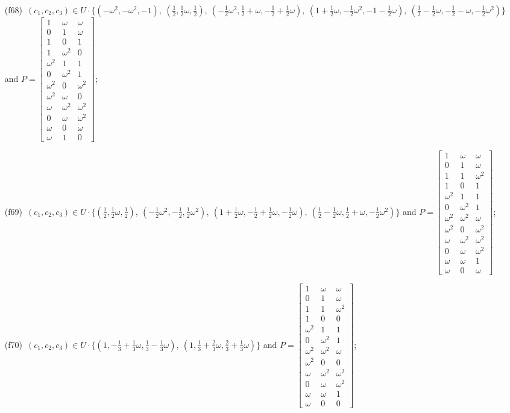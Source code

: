 \begin{enumerate}
\item[(f68)\,\newitem] $(c_1,c_2,c_3)\in U\cdot\{(-\omega^2,-\omega^2,-1),\allowbreak\ (\tfrac{1}{2},\tfrac{1}{2}\omega,\tfrac{1}{2}),\allowbreak\ (-\tfrac{1}{2}\omega^2,\tfrac{1}{2}+\omega,-\tfrac{1}{2}+\tfrac{1}{2}\omega),\allowbreak\ (1+\tfrac{1}{2}\omega,-\tfrac{1}{2}\omega^2,-1-\tfrac{1}{2}\omega),\allowbreak\ (\tfrac{1}{2}-\tfrac{1}{2}\omega,-\tfrac{1}{2}-\omega,-\tfrac{1}{2}\omega^2)\}$ and $P=\begin{bmatrix}1&\omega&\omega\\0&1&\omega\\1&0&1\\1&\omega^2&0\\\omega^2&1&1\\0&\omega^2&1\\\omega^2&0&\omega^2\\\omega^2&\omega&0\\\omega&\omega^2&\omega^2\\0&\omega&\omega^2\\\omega&0&\omega\\\omega&1&0\end{bmatrix}$;
\item[(f69)\,\newitem] $(c_1,c_2,c_3)\in U\cdot\{(\tfrac{1}{2},\tfrac{1}{2}\omega,\tfrac{1}{2}),\allowbreak\ (-\tfrac{1}{2}\omega^2,-\tfrac{1}{2},\tfrac{1}{2}\omega^2),\allowbreak\ (1+\tfrac{1}{2}\omega,-\tfrac{1}{2}+\tfrac{1}{2}\omega,-\tfrac{1}{2}\omega),\allowbreak\ (\tfrac{1}{2}-\tfrac{1}{2}\omega,\tfrac{1}{2}+\omega,-\tfrac{1}{2}\omega^2)\}$ and $P=\begin{bmatrix}1&\omega&\omega\\0&1&\omega\\1&1&\omega^2\\1&0&1\\\omega^2&1&1\\0&\omega^2&1\\\omega^2&\omega^2&\omega\\\omega^2&0&\omega^2\\\omega&\omega^2&\omega^2\\0&\omega&\omega^2\\\omega&\omega&1\\\omega&0&\omega\end{bmatrix}$;
\item[(f70)\,\newitem] $(c_1,c_2,c_3)\in U\cdot\{(1,-\tfrac{1}{3}+\tfrac{1}{3}\omega,\tfrac{1}{3}-\tfrac{1}{3}\omega),\allowbreak\ (1,\tfrac{1}{3}+\tfrac{2}{3}\omega,\tfrac{2}{3}+\tfrac{1}{3}\omega)\}$ and $P=\begin{bmatrix}1&\omega&\omega\\0&1&\omega\\1&1&\omega^2\\1&0&0\\\omega^2&1&1\\0&\omega^2&1\\\omega^2&\omega^2&\omega\\\omega^2&0&0\\\omega&\omega^2&\omega^2\\0&\omega&\omega^2\\\omega&\omega&1\\\omega&0&0\end{bmatrix}$;

\end{enumerate}
